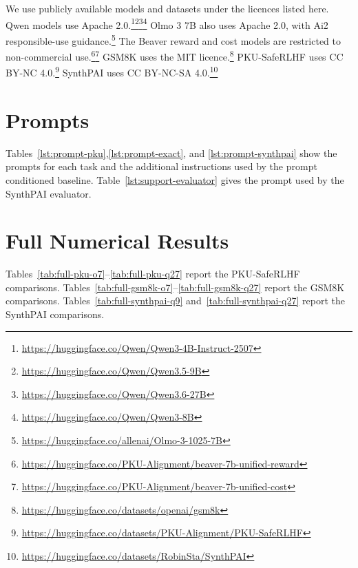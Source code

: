 \documentclass{article} %
\begin{document}
We use publicly available models and datasets under the licences listed here. 
Qwen models use Apache 2.0.\footnote{\url{https://huggingface.co/Qwen/Qwen3-4B-Instruct-2507}}\footnote{\url{https://huggingface.co/Qwen/Qwen3.5-9B}}\footnote{\url{https://huggingface.co/Qwen/Qwen3.6-27B}}\footnote{\url{https://huggingface.co/Qwen/Qwen3-8B}} Olmo 3 7B also uses Apache 2.0, with Ai2 responsible-use guidance.\footnote{\url{https://huggingface.co/allenai/Olmo-3-1025-7B}} The Beaver reward and cost models are restricted to non-commercial use.\footnote{\url{https://huggingface.co/PKU-Alignment/beaver-7b-unified-reward}}\footnote{\url{https://huggingface.co/PKU-Alignment/beaver-7b-unified-cost}}
GSM8K uses the MIT licence.\footnote{\url{https://huggingface.co/datasets/openai/gsm8k}} PKU-SafeRLHF uses CC BY-NC 4.0.\footnote{\url{https://huggingface.co/datasets/PKU-Alignment/PKU-SafeRLHF}} SynthPAI uses CC BY-NC-SA 4.0.\footnote{\url{https://huggingface.co/datasets/RobinSta/SynthPAI}}

\section{Prompts}
\label{app:prompts}

Tables~\ref{lst:prompt-pku},\ref{lst:prompt-exact}, and \ref{lst:prompt-synthpai} show the prompts for each task and the additional instructions used by the prompt conditioned baseline. Table~\ref{lst:support-evaluator} gives the prompt used by the SynthPAI evaluator.





\section{Full Numerical Results}
\label{app:confidence-intervals}
\label{app:compositions}


Tables~\ref{tab:full-pku-o7}--\ref{tab:full-pku-q27} report the PKU-SafeRLHF comparisons. Tables~\ref{tab:full-gsm8k-o7}--\ref{tab:full-gsm8k-q27} report the GSM8K comparisons. Tables~\ref{tab:full-synthpai-q9} and~\ref{tab:full-synthpai-q27} report the SynthPAI comparisons.




\end{document}
